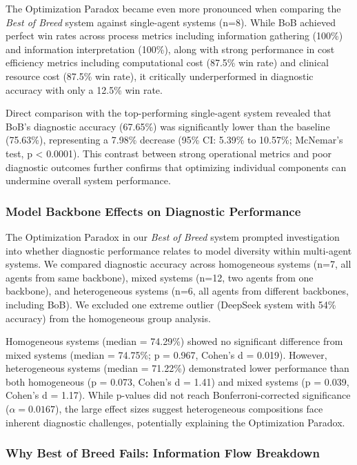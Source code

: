 \documentclass[manuscript, nonacm]{acmart}
\begin{document}
The Optimization Paradox became even more pronounced when comparing the \textit{Best of Breed} system against single-agent systems (n=8). While BoB achieved perfect win rates across process metrics including information gathering (100\%) and information interpretation (100\%), along with strong performance in cost efficiency metrics including computational cost (87.5\% win rate) and clinical resource cost (87.5\% win rate), it critically underperformed in diagnostic accuracy with only a 12.5\% win rate.

Direct comparison with the top-performing single-agent system revealed that BoB's diagnostic accuracy (67.65\%) was significantly lower than the baseline (75.63\%), representing a 7.98\% decrease (95\% CI: 5.39\% to 10.57\%; McNemar's test, p < 0.0001). This contrast between strong operational metrics and poor diagnostic outcomes further confirms that optimizing individual components can undermine overall system performance.


\subsubsection{\textbf{Model Backbone Effects on Diagnostic Performance
}}

The Optimization Paradox in our \textit{Best of Breed} system prompted investigation into whether diagnostic performance relates to model diversity within multi-agent systems. We compared diagnostic accuracy across homogeneous systems (n=7, all agents from same backbone), mixed systems (n=12, two agents from one backbone), and heterogeneous systems (n=6, all agents from different backbones, including BoB). We excluded one extreme outlier (DeepSeek system with 54\% accuracy) from the homogeneous group analysis.

Homogeneous systems (median = 74.29\%) showed no significant difference from mixed systems (median = 74.75\%; p = 0.967, Cohen's d = 0.019). However, heterogeneous systems (median = 71.22\%) demonstrated lower performance than both homogeneous (p = 0.073, Cohen's d = 1.41) and mixed systems (p = 0.039, Cohen's d = 1.17). While p-values did not reach Bonferroni-corrected significance ($\alpha = 0.0167$), the large effect sizes suggest heterogeneous compositions face inherent diagnostic challenges, potentially explaining the Optimization Paradox.

\subsubsection{\textbf{Why Best of Breed Fails: Information Flow Breakdown}}
\end{document}
